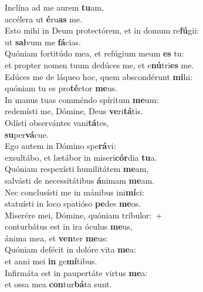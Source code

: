 \evenverse Inclína ad me aurem \textbf{tu}am,~\*\\
\evenverse accélera ut \textbf{é}ru\textbf{as} me.\\
\oddverse Esto mihi in Deum protectórem, et in domum re\textbf{fú}gii:~\*\\
\oddverse ut \textbf{sal}vum me \textbf{fá}cias.\\
\evenverse Quóniam fortitúdo mea, et refúgium meum \textbf{es} tu:~\*\\
\evenverse et propter nomen tuum dedúces me, et e\textbf{nú}tri\textbf{es} me.\\
\oddverse Edúces me de láqueo hoc, quem abscondérunt \textbf{mi}hi:~\*\\
\oddverse quóniam tu es pro\textbf{té}ctor \textbf{me}us.\\
\evenverse In manus tuas comméndo spíritum \textbf{me}um:~\*\\
\evenverse redemísti me, Dómine, Deus \textbf{ve}ri\textbf{tá}tis.\\
\oddverse Odísti observántes vani\textbf{tá}tes,~\*\\
\oddverse \textbf{su}per\textbf{vá}cue.\\
\evenverse Ego autem in Dómino spe\textbf{rá}vi:~\*\\
\evenverse exsultábo, et lætábor in miseri\textbf{cór}dia \textbf{tu}a.\\
\oddverse Quóniam respexísti humilitátem \textbf{me}am,~\*\\
\oddverse salvásti de necessitátibus \textbf{á}nimam \textbf{me}am.\\
\evenverse Nec conclusísti me in mánibus ini\textbf{mí}ci:~\*\\
\evenverse statuísti in loco spatióso \textbf{pe}des \textbf{me}os.\\
\oddverse Miserére mei, Dómine, quóniam tríbulor:~+\\
\oddverse  conturbátus est in ira óculus \textbf{me}us,~\*\\
\oddverse ánima mea, et \textbf{ven}ter \textbf{me}us:\\
\evenverse Quóniam defécit in dolóre vita \textbf{me}a:~\*\\
\evenverse et anni mei \textbf{in} ge\textbf{mí}tibus.\\
\oddverse Infirmáta est in paupertáte virtus \textbf{me}a:~\*\\
\oddverse et ossa mea \textbf{con}tur\textbf{bá}ta sunt.\\
